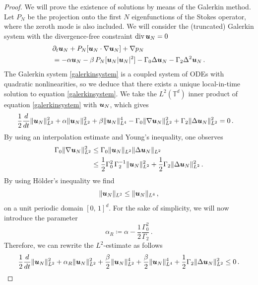 \documentclass[11pt]{amsart}
\newcommand{\bu}{\mbox{\boldmath$u$}}
\newcommand{\Rb}{\beta}
\newcommand{\Gamzero}{\Gamma_{0}}
\newcommand{\Gamtwo}{\Gamma_{2}}
\theoremstyle{definition}
\numberwithin{equation}{section}
\numberwithin{equation}{section}
\begin{document}
\begin{proof}
We will prove the existence of solutions by means of the Galerkin method. Let $P_N$ be the projection onto the first $N$ eigenfunctions of the Stokes operator, where the zeroth mode is also included.  We will consider the (truncated) Galerkin system with the divergence-free constraint $\mbox{div}\,\bu_N = 0$
\begin{align}
&\partial_{t} \bu_N + P_N [\bu_N \cdot\nabla \bu_N] + \nabla p_N \nonumber \\
&= -\alpha\bu_N - \Rb\,P_N [\bu_N|\bu_N|^{2}] - \Gamzero \Delta\bu_N - \Gamtwo \Delta^{2}\bu_N\,. \label{galerkinsystem}
\end{align}
The Galerkin system \eqref{galerkinsystem} is a coupled system of ODEs with quadratic nonlinearities, so we deduce that there exists a unique local-in-time solution to equation \eqref{galerkinsystem}. We take the $L^2 (\mathbb{T}^d)$ inner product of equation \eqref{galerkinsystem} with $\bu_N$, which gives
\begin{align*}
&\frac{1}{2} \frac{d}{d t} \lVert \bu_N \rVert_{L^2}^2 + \alpha \lVert \bu_N \rVert_{L^2}^2 + \Rb \lVert \bu_N \rVert_{L^4}^4 - \Gamzero \lVert \nabla \bu_N \rVert_{L^2}^2 + \Gamtwo \lVert \Delta \bu_N \rVert_{L^2}^2 = 0\,.
\end{align*}
By using an interpolation estimate and Young's inequality, one observes 
\begin{align}
\Gamzero \lVert \nabla \bu_N \rVert_{L^2}^2 &\leq \Gamzero \lVert \bu_N \rVert_{L^2} \lVert \Delta \bu_N \rVert_{L^2} \nonumber \\
&\leq \frac{1}{2} \Gamzero^{2}\,\Gamtwo^{-1} \lVert \bu_N \rVert_{L^2}^2 + \frac{1}{2} \Gamtwo \lVert \Delta \bu_N \rVert_{L^2}^2\,. \label{antidiffusionyoungestimate}
\end{align}
By using H\"{o}lder's inequality we find
\begin{equation*}
\lVert \bu_N \rVert_{L^2} \leq \lVert \bu_N \rVert_{L^4}\,,
\end{equation*}
on a unit periodic domain $[0,\,1]^d$. For the sake of simplicity, we will now introduce the parameter
\begin{equation}
\alpha_{R} \coloneqq \alpha - \frac{1}{2} \frac{\Gamzero^2}{\Gamtwo}\,.
\end{equation}
Therefore, we can rewrite the $L^2$-estimate as follows 
\begin{align*}
\frac{1}{2} \frac{d}{d t} \lVert \bu_N \rVert_{L^2}^2 + \alpha_{R}\lVert \bu_N \rVert_{L^2}^2 + 
\frac{\Rb}{2} \lVert \bu_N \rVert_{L^2}^{4} + \frac{\Rb}{2} \lVert \bu_N \rVert_{L^4}^{4} + \frac{1}{2} \Gamtwo \lVert \Delta \bu_N \rVert_{L^2}^2 \leq 0\,.

\end{align*}
\end{proof}
\end{document}
